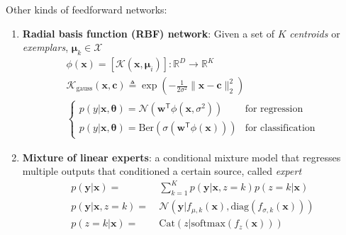 Other kinds of feedforward networks:
\begin{enumerate}[{(1)}]
    \item 
    \textbf{Radial basis function (RBF) network}: 
    Given a set of $K$ \textit{centroids} or \textit{exemplars}, $\bm{\mu}_k\in\mathcal{X}$
    \begin{gather}
        \phi(\bm{x}) 
        = \left[\mathcal{K}(\bm{x},\bm{\mu}_i)\right]:\mathbb{R}^D\to\mathbb{R}^{K}\\
        \mathcal{K}_\text{gauss}(\bm{x},\bm{c})
        \triangleq \exp\left(-\frac{1}{2\sigma^2}\|\bm{x}-\bm{c}\|_2^2\right) \\
        \begin{cases}
        p(y|\bm{x},\bm{\theta}) = \mathcal{N}(\bm{w}^\mathsf{T}\phi(\bm{x},\sigma^2)) & \text{for regression} \\
        p(y|\bm{x},\bm{\theta}) = \mathrm{Ber}(\sigma(\bm{w}^\mathsf{T}\phi(\bm{x}))) & \text{for classification}
        \end{cases}
    \end{gather}
    \item 
    \textbf{Mixture of linear experts}: a conditional mixture model that regresses multiple outputs that conditioned a certain source, called \textit{expert}
    \begin{align}
        p(\bm{y}|\bm{x}) =&~ \sum_{k=1}^K p(\bm{y}|\bm{x},z=k)p(z=k|\bm{x}) \\
        p(\bm{y}|\bm{x},z=k) =&~ \mathcal{N}(\bm{y}|f_{\mu,k}(\bm{x}),\mathrm{diag}(f_{\sigma,k}(\bm{x}))) \\
        p(z=k|\bm{x}) =&~ \mathrm{Cat}(z|\mathrm{softmax}(f_z(\bm{x})))
    \end{align}
\end{enumerate}



